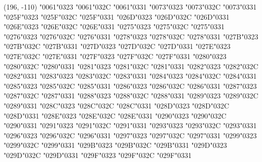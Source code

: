 (196, -110) \char"0061\cgj\char"0323 \char"0061\cgj\char"032C \char"0061\cgj\char"0331 \char"0073\cgj\char"0323 \char"0073\cgj\char"032C \char"0073\cgj\char"0331 \char"025F\cgj\char"0323 \char"025F\cgj\char"032C \char"025F\cgj\char"0331 \char"026D\cgj\char"0323 \char"026D\cgj\char"032C \char"026D\cgj\char"0331 \char"026E\cgj\char"0323 \char"026E\cgj\char"032C \char"026E\cgj\char"0331 \char"0275\cgj\char"0323 \char"0275\cgj\char"032C \char"0275\cgj\char"0331 \char"0276\cgj\char"0323 \char"0276\cgj\char"032C \char"0276\cgj\char"0331 \char"0278\cgj\char"0323 \char"0278\cgj\char"032C \char"0278\cgj\char"0331 \char"027B\cgj\char"0323 \char"027B\cgj\char"032C \char"027B\cgj\char"0331 \char"027D\cgj\char"0323 \char"027D\cgj\char"032C \char"027D\cgj\char"0331 \char"027E\cgj\char"0323 \char"027E\cgj\char"032C \char"027E\cgj\char"0331 \char"027F\cgj\char"0323 \char"027F\cgj\char"032C \char"027F\cgj\char"0331 \char"0280\cgj\char"0323 \char"0280\cgj\char"032C \char"0280\cgj\char"0331 \char"0281\cgj\char"0323 \char"0281\cgj\char"032C \char"0281\cgj\char"0331 \char"0282\cgj\char"0323 \char"0282\cgj\char"032C \char"0282\cgj\char"0331 \char"0283\cgj\char"0323 \char"0283\cgj\char"032C \char"0283\cgj\char"0331 \char"0284\cgj\char"0323 \char"0284\cgj\char"032C \char"0284\cgj\char"0331 \char"0285\cgj\char"0323 \char"0285\cgj\char"032C \char"0285\cgj\char"0331 \char"0286\cgj\char"0323 \char"0286\cgj\char"032C \char"0286\cgj\char"0331 \char"0287\cgj\char"0323 \char"0287\cgj\char"032C \char"0287\cgj\char"0331 \char"0288\cgj\char"0323 \char"0288\cgj\char"032C \char"0288\cgj\char"0331 \char"0289\cgj\char"0323 \char"0289\cgj\char"032C \char"0289\cgj\char"0331 \char"028C\cgj\char"0323 \char"028C\cgj\char"032C \char"028C\cgj\char"0331 \char"028D\cgj\char"0323 \char"028D\cgj\char"032C \char"028D\cgj\char"0331 \char"028E\cgj\char"0323 \char"028E\cgj\char"032C \char"028E\cgj\char"0331 \char"0290\cgj\char"0323 \char"0290\cgj\char"032C \char"0290\cgj\char"0331 \char"0291\cgj\char"0323 \char"0291\cgj\char"032C \char"0291\cgj\char"0331 \char"0293\cgj\char"0323 \char"0293\cgj\char"032C \char"0293\cgj\char"0331 \char"0296\cgj\char"0323 \char"0296\cgj\char"032C \char"0296\cgj\char"0331 \char"0297\cgj\char"0323 \char"0297\cgj\char"032C \char"0297\cgj\char"0331 \char"0299\cgj\char"0323 \char"0299\cgj\char"032C \char"0299\cgj\char"0331 \char"029B\cgj\char"0323 \char"029B\cgj\char"032C \char"029B\cgj\char"0331 \char"029D\cgj\char"0323 \char"029D\cgj\char"032C \char"029D\cgj\char"0331 \char"029F\cgj\char"0323 \char"029F\cgj\char"032C \char"029F\cgj\char"0331

